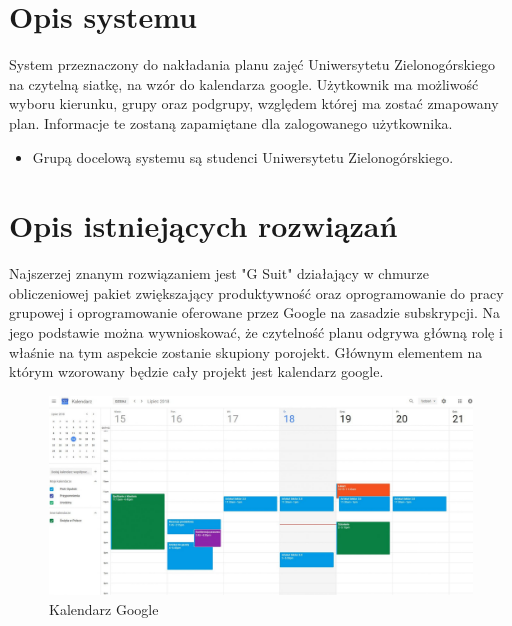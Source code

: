 \documentclass[a4paper,11pt]{uzreport}
\author{
  Erwin Konkel\\
  Mateusz Znojek\\
  Stanisław Mól - Scrum Master\\
}
\date{20.01.2021}
\begin{document}
  \maketitle
  
\section{Opis systemu}
	System przeznaczony do nakładania planu zajęć Uniwersytetu Zielonogórskiego na czytelną siatkę, na wzór do kalendarza google. Użytkownik ma możliwość wyboru kierunku, grupy oraz podgrupy, względem której ma zostać zmapowany plan. Informacje te zostaną zapamiętane dla zalogowanego użytkownika.
    
    \begin{itemize}[leftmargin=0.50in]

        \item Grupą docelową systemu są studenci Uniwersytetu Zielonogórskiego.


    
    \end{itemize}

\section{Opis istniejących rozwiązań}
	Najszerzej znanym rozwiązaniem jest "G Suit" działający w chmurze obliczeniowej pakiet zwiększający produktywność oraz oprogramowanie do pracy grupowej i oprogramowanie oferowane przez Google na zasadzie subskrypcji. Na jego podstawie można wywnioskować, że czytelność planu odgrywa główną rolę i właśnie na tym aspekcie zostanie skupiony porojekt. Głównym elementem na którym wzorowany będzie cały projekt jest kalendarz google.

    \begin{figure}[ht!]
        \centering
        \includegraphics[width=6in]{pictures/Kalendarz-Google_1.jpg}
        \caption{Kalendarz Google}
        \label{fig2}
     \end{figure}
\end{document}

